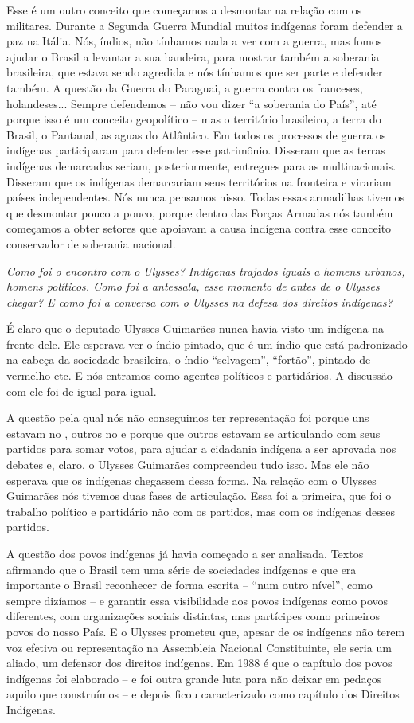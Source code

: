 Esse é um outro conceito que começamos a desmontar na relação com os
militares. Durante a Segunda Guerra Mundial muitos indígenas foram
defender a paz na Itália. Nós, índios, não tínhamos nada a ver com a
guerra, mas fomos ajudar o Brasil a levantar a sua bandeira, para
mostrar também a soberania brasileira, que estava sendo agredida e nós
tínhamos que ser parte e defender também. A questão da Guerra do
Paraguai, a guerra contra os franceses, holandeses... Sempre defendemos
-- não vou dizer ``a soberania do País'', até porque isso é um conceito
geopolítico -- mas o território brasileiro, a terra do Brasil, o
Pantanal, as aguas do Atlântico. Em todos os processos de guerra os
indígenas participaram para defender esse patrimônio. Disseram que as
terras indígenas demarcadas seriam, posteriormente, entregues para as
multinacionais. Disseram que os indígenas demarcariam seus territórios
na fronteira e virariam países independentes. Nós nunca pensamos nisso.
Todas essas armadilhas tivemos que desmontar pouco a pouco, porque
dentro das Forças Armadas nós também começamos a obter setores que
apoiavam a causa indígena contra esse conceito conservador de soberania
nacional.

\medskip

\noindent\emph{Como foi o encontro com o Ulysses? Indígenas trajados iguais a
homens urbanos, homens políticos. Como foi a antessala, esse momento de
antes de o Ulysses chegar? E como foi a conversa com o Ulysses na defesa
dos direitos indígenas?}

É claro que o deputado Ulysses Guimarães nunca havia
visto um indígena na frente dele. Ele esperava ver o índio pintado, que
é um índio que está padronizado na cabeça da sociedade brasileira, o
índio ``selvagem'', ``fortão'', pintado de vermelho etc. E nós entramos
como agentes políticos e partidários. A discussão com ele foi de igual
para igual.

A questão pela qual nós não conseguimos ter representação foi porque uns
estavam no , outros no  e porque que outros estavam se articulando
com seus partidos para somar votos, para ajudar a cidadania indígena a
ser aprovada nos debates e, claro, o Ulysses Guimarães compreendeu tudo
isso. Mas ele não esperava que os indígenas chegassem dessa forma. Na
relação com o Ulysses Guimarães nós tivemos duas fases de articulação.
Essa foi a primeira, que foi o trabalho político e partidário não com os
partidos, mas com os indígenas desses partidos.

A questão dos povos indígenas já havia começado a ser analisada. Textos
afirmando que o Brasil tem uma série de sociedades indígenas e que era
importante o Brasil reconhecer de forma escrita -- ``num outro nível'',
como sempre dizíamos -- e garantir essa visibilidade aos povos indígenas
como povos diferentes, com organizações sociais distintas, mas
partícipes como primeiros povos do nosso País. E o Ulysses prometeu que,
apesar de os indígenas não terem voz efetiva ou representação na
Assembleia Nacional Constituinte, ele seria um aliado, um defensor dos
direitos indígenas. Em 1988 é que o capítulo dos povos indígenas foi
elaborado -- e foi outra grande luta para não deixar em pedaços aquilo
que construímos -- e depois ficou caracterizado como capítulo dos
Direitos Indígenas.

